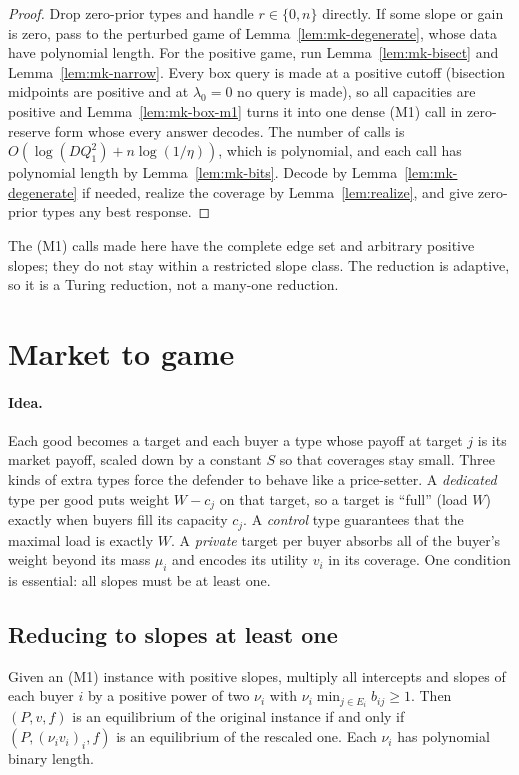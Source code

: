 \begin{proof}
Drop zero-prior types and handle $r\in\{0,n\}$ directly. If some slope or gain is zero, pass to the
perturbed game of Lemma~\ref{lem:mk-degenerate}, whose data have polynomial length. For the positive
game, run Lemma~\ref{lem:mk-bisect} and Lemma~\ref{lem:mk-narrow}. Every box query is made at a positive
cutoff (bisection midpoints are positive and at $\lambda_0=0$ no query is made), so all capacities are
positive and Lemma~\ref{lem:mk-box-m1} turns it into one dense (M1) call in zero-reserve form whose
every answer decodes. The number of calls is $O(\log(DQ_1^2)+n\log(1/\eta))$, which is polynomial, and
each call has polynomial length by Lemma~\ref{lem:mk-bits}. Decode by Lemma~\ref{lem:mk-degenerate} if
needed, realize the coverage by Lemma~\ref{lem:realize}, and give zero-prior types any best response.
\end{proof}

The (M1) calls made here have the complete edge set and arbitrary positive slopes; they do not stay
within a restricted slope class. The reduction is adaptive, so it is a Turing reduction, not a many-one
reduction.

\section{Market to game}\label{sec:mk-m2g}

\paragraph{Idea.} Each good becomes a target and each buyer a type whose payoff at target $j$ is its
market payoff, scaled down by a constant $S$ so that coverages stay small. Three kinds of extra types
force the defender to behave like a price-setter. A \emph{dedicated} type per good puts weight
$W-c_j$ on that target, so a target is ``full'' (load $W$) exactly when buyers fill its capacity $c_j$. A
\emph{control} type guarantees that the maximal load is exactly $W$. A \emph{private} target per buyer
absorbs all of the buyer's weight beyond its mass $\mu_i$ and encodes its utility $v_i$ in its
coverage. One condition is essential: all slopes must be at least one.

\subsection{Reducing to slopes at least one}

\begin{lemma}\label{lem:mk-rescale}
\statuslean
Given an (M1) instance with positive slopes, multiply all intercepts and slopes of each buyer $i$ by a
positive power of two $\nu_i$ with $\nu_i\min_{j\in E_i}b_{ij}\ge1$. Then $(P,v,f)$ is an equilibrium of
the original instance if and only if $(P,(\nu_iv_i)_i,f)$ is an equilibrium of the rescaled one. Each
$\nu_i$ has polynomial binary length.
\end{lemma}

